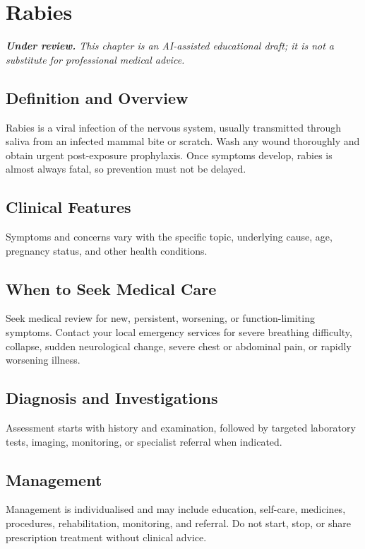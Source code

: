 \chapter{Rabies}

\medskip
\noindent\textit{\textbf{Under review.} This chapter is an AI-assisted educational draft; it is not a substitute for professional medical advice.}

\section*{Definition and Overview}
Rabies is a viral infection of the nervous system, usually transmitted through saliva from an infected mammal bite or scratch. Wash any wound thoroughly and obtain urgent post-exposure prophylaxis. Once symptoms develop, rabies is almost always fatal, so prevention must not be delayed.

\section*{Clinical Features}
Symptoms and concerns vary with the specific topic, underlying cause, age, pregnancy status, and other health conditions.

\section*{When to Seek Medical Care}
Seek medical review for new, persistent, worsening, or function-limiting symptoms. Contact your local emergency services for severe breathing difficulty, collapse, sudden neurological change, severe chest or abdominal pain, or rapidly worsening illness.

\section*{Diagnosis and Investigations}
Assessment starts with history and examination, followed by targeted laboratory tests, imaging, monitoring, or specialist referral when indicated.

\section*{Management}
Management is individualised and may include education, self-care, medicines, procedures, rehabilitation, monitoring, and referral. Do not start, stop, or share prescription treatment without clinical advice.

